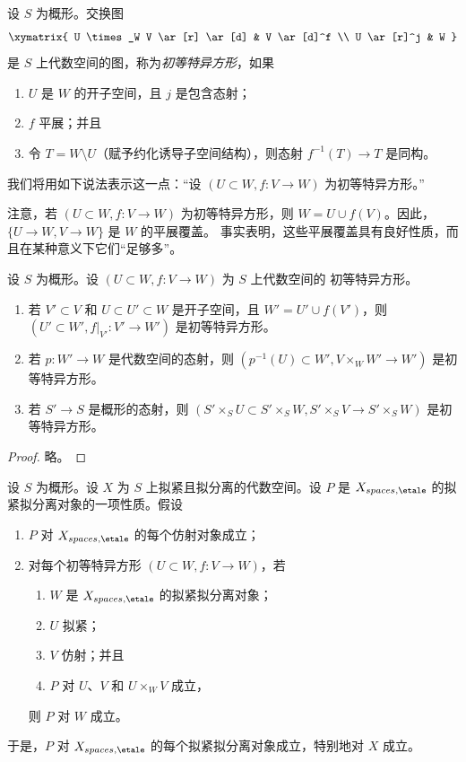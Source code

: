 \begin{definition}
\label{definition-elementary-distinguished-square}
设 $S$ 为概形。交换图
$$
\xymatrix{
U \times_W V \ar[r] \ar[d] & V \ar[d]^f \\
U \ar[r]^j & W
}
$$
是 $S$ 上代数空间的图，称为{\it 初等特异方形}，如果
\begin{enumerate}
\item $U$ 是 $W$ 的开子空间，且 $j$ 是包含态射；
\item $f$ 平展；并且
\item 令 $T = W \setminus U$（赋予约化诱导子空间结构），则态射
$f^{-1}(T) \to T$ 是同构。
\end{enumerate}
我们将用如下说法表示这一点：“设 $(U \subset W, f : V \to W)$
为初等特异方形。”
\end{definition}

\noindent
注意，若 $(U \subset W, f : V \to W)$ 为初等特异方形，则
$W = U \cup f(V)$。因此，$\{U \to W, V \to W\}$ 是 $W$ 的平展覆盖。
事实表明，这些平展覆盖具有良好性质，而且在某种意义下它们“足够多”。

\begin{lemma}
\label{lemma-make-more-elementary-distinguished-squares}
设 $S$ 为概形。设 $(U \subset W, f : V \to W)$ 为 $S$ 上代数空间的
初等特异方形。
\begin{enumerate}
\item 若 $V' \subset V$ 和 $U \subset U' \subset W$ 是开子空间，且
$W' = U' \cup f(V')$，则
$(U' \subset W', f|_{V'} : V' \to W')$ 是初等特异方形。
\item 若 $p : W' \to W$ 是代数空间的态射，则
$(p^{-1}(U) \subset W', V \times_W W' \to W')$ 是初等特异方形。
\item 若 $S' \to S$ 是概形的态射，则
$(S' \times_S U \subset S' \times_S W, S' \times_S V \to S' \times_S W)$
是初等特异方形。
\end{enumerate}
\end{lemma}

\begin{proof}
略。
\end{proof}

\begin{lemma}
\label{lemma-induction-principle}
设 $S$ 为概形。设 $X$ 为 $S$ 上拟紧且拟分离的代数空间。设 $P$ 是
$X_{spaces, \etale}$ 的拟紧拟分离对象的一项性质。假设
\begin{enumerate}
\item $P$ 对 $X_{spaces, \etale}$ 的每个仿射对象成立；
\item 对每个初等特异方形 $(U \subset W, f : V \to W)$，若
\begin{enumerate}
\item $W$ 是 $X_{spaces, \etale}$ 的拟紧拟分离对象；
\item $U$ 拟紧；
\item $V$ 仿射；并且
\item $P$ 对 $U$、$V$ 和 $U \times_W V$ 成立，
\end{enumerate}
则 $P$ 对 $W$ 成立。
\end{enumerate}
于是，$P$ 对 $X_{spaces, \etale}$ 的每个拟紧拟分离对象成立，特别地对
$X$ 成立。
\end{lemma}

